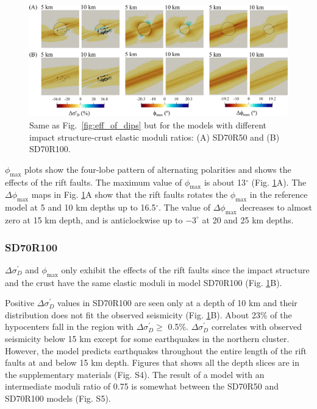 \documentclass[draft]{agujournal2018}
\begin{document}
\begin{figure}[ht]
\centering
\includegraphics[width=30pc]{Figures/SD70R50_100_2.png}
\caption{Same as Fig.~\ref{fig:eff_of_dips} but for the models with different impact structure-crust elastic moduli ratios: (A) SD70R50 and (B) SD70R100.}
\label{fig:eff_of_moduli_ratio}
\end{figure}

$\phi_{\max}$ plots show the four-lobe pattern of alternating polarities and shows the effects of the rift faults. The maximum value of $\phi_{\max}$ is about 13$^\circ$ (Fig. \ref{fig:eff_of_moduli_ratio}A). The $\Delta\phi_{\max}$ maps in Fig. \ref{fig:eff_of_moduli_ratio}A show that the rift faults rotates the $\phi_{\max}$ in the reference model at 5 and 10 km depths up to 16.5$^{\circ}$. The value of $\Delta\phi_{\max}$ decreases to almost zero at 15 km depth, and is anticlockwise up to $-3^{\circ}$ at 20 and 25 km depths.

\subsubsection{SD70R100}
$\Delta\sigma_{D}^{\prime}$ and $\phi_{\max}$ only exhibit the effects of the rift faults since the impact structure and the crust have the same elastic moduli in model SD70R100 (Fig. \ref{fig:eff_of_moduli_ratio}B).

Positive $\Delta\sigma_{D}^{\prime}$ values in SD70R100 are seen only at a depth of 10 km and their distribution does not fit the observed seismicity (Fig. \ref{fig:eff_of_moduli_ratio}B). About 23\% of the hypocenters fall in the region with $\Delta\sigma_{D}^{\prime} \ge$ 0.5\%. $\Delta\sigma_{D}^{\prime}$ correlates with observed seismicity below 15 km except for some earthquakes in the northern cluster. However, the model predicts earthquakes throughout the entire length of the rift faults at and below 15 km depth. Figures that shows all the depth slices are in the supplementary materials (Fig. S4). The result of a model with an intermediate moduli ratio of 0.75 is somewhat between the SD70R50 and SD70R100 models (Fig. S5).
\end{document}
